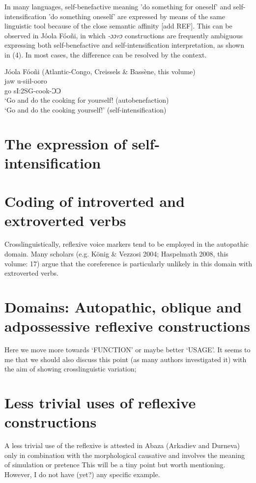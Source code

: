 \documentclass[output=paper]{langsci/langscibook}
\begin{document}
In many languages, self-benefactive meaning 'do something for oneself' and self-intensification 'do something oneself' are expressed by means of the same linguistic tool because of the close semantic affinity [add REF]. This can be observed in Jóola  Fóoñi, in which \emph{-ɔɔrɔ} constructions are frequently ambiguous expressing both self-benefactive and self-intensification interpretation, as shown in (4). In most cases, the difference can be resolved by the context.

\ea\label{ex:treis:4} Jóola Fóoñi (Atlantic-Congo, Creissels & Bassène, this volume) \\
\gll jaw  u-siil-ooro \\                             
    go  sI:2SG-cook-ƆƆ \\                             
\glt ‘Go and do the cooking for yourself! (autobenefaction) \\
\glt ‘Go and do the cooking yourself!’ (self-intensification) 





  


\section{The expression of self-intensification}

\section{Coding of introverted and extroverted verbs}
Crosslinguistically, reflexive  voice  markers tend to be employed  in the autopathic domain. Many scholars (e.g. König & Vezzosi 2004; Haspelmath 2008, this volume: 17) argue that the coreference is particularly unlikely in this domain with extroverted verbs. 







\section{Domains: Autopathic, oblique and adpossessive reflexive constructions}
Here we move more towards ‘FUNCTION’ or maybe better ‘USAGE’. It seems to me that we should also discuss this point (as many authors investigated it) with the aim of showing crosslinguistic variation;

\section{Less trivial uses of reflexive constructions}
A less trivial use of the reflexive is attested in Abaza (Arkadiev and Durneva) only in combination with the morphological causative and involves the meaning of simulation or pretence
This will be a tiny point but worth mentioning. However, I do not have (yet?) any specific example.
\end{document}
